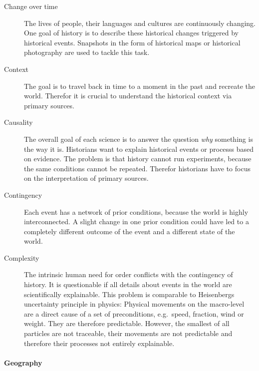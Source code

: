 \vspace{-1em}
\begin{description} %
  \item[Change over time]
  The lives of people, their languages and cultures are continuously changing. One goal of history is to describe these historical changes triggered by historical events. Snapshots in the form of historical maps or historical photography are used to tackle this task.
  \item[Context] The goal is to travel back in time to a moment in the past and recreate the world. Therefor it is crucial to understand the historical context via primary sources.
  \item[Causality]
  The overall goal of each science is to answer the question \emph{why} something is the way it is. Historians want to explain historical events or processs based on evidence. The problem is that history cannot run experiments, because the same conditions cannot be repeated. Therefor historians have to focus on the interpretation of primary sources.
  \item[Contingency]
  Each event has a network of prior conditions, because the world is highly interconnected. A slight change in one prior condition could have led to a completely different outcome of the event and a different state of the world.
  \item[Complexity]
  The intrinsic human need for order conflicts with the contingency of history. It is questionable if all details about events in the world are scientifically explainable.
  This problem is comparable to Heisenbergs uncertainty principle in physics: Physical movements on the macro-level are a direct cause of a set of preconditions, e.g.\ speed, fraction, wind or weight. They are therefore predictable. However, the smallest of all particles are not traceable, their movements are not predictable and therefore their processes not entirely explainable.
\end{description}


\paragraph{Geography} %
\label{par:geography}

